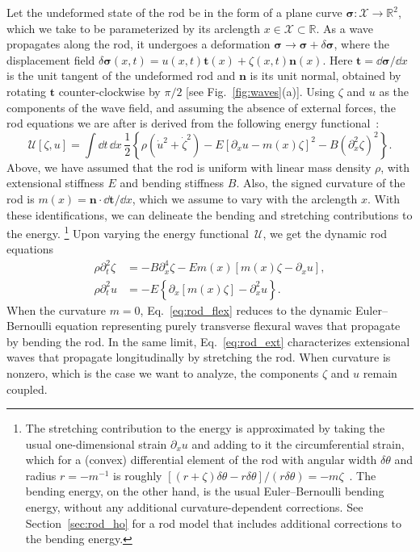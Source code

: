 Let the undeformed state of the rod be in the form of a plane curve $\bm{\sigma}: \mathcal{X} \to \mathbb{R}^{2}$, which we take to be parameterized by its arclength $x \in \mathcal{X} \subset \mathbb{R}$.
As a wave propagates along the rod, it undergoes a deformation $\bm{\sigma} \to \bm{\sigma} + \delta\bm{\sigma}$, where the displacement field $\delta\bm{\sigma}(x,t) = u(x,t)\bm{t}(x) + \zeta(x,t)\bm{n}(x)$.
Here $\bm{t} = \dd\bm{\sigma}/\dd{x}$ is the unit tangent of the undeformed rod and $\bm{n}$ is its unit normal, obtained by rotating $\bm{t}$ counter-clockwise by $\pi/2$ [see Fig.~\ref{fig:waves}(a)].
Using $\zeta$ and $u$ as the components of the wave field, and assuming the absence of external forces, the rod equations we are after is derived from the following energy functional~\cite{kernes2021}:
%
\begin{equation}
  \mathscr{U}[\zeta, u] = \int \dd{t}\,\dd{x}\,\frac{1}{2}\left\{\rho\left(\dot{u}^{2} + \dot{\zeta}^{2}\right) - E\left[\partial_{x}u - m(x)\zeta\right]^{2} - B\left(\partial_{x}^{2}\zeta\right)^{2}\right\}.
  \label{eq:rod_energy}
\end{equation}
%
Above, we have assumed that the rod is uniform with linear mass density $\rho$, with extensional stiffness $E$ and bending stiffness $B$.
Also, the signed curvature of the rod is $m(x) = \bm{n}\cdot\dd\bm{t}/\dd{x}$, which we assume to vary with the arclength $x$.
With these identifications, we can delineate the bending and stretching contributions to the energy.%
\footnote{%
  The stretching contribution to the energy is approximated by taking the usual one-dimensional strain $\partial_{x}u$ and adding to it the circumferential strain, which for a (convex) differential element of the rod with angular width $\delta\theta$ and radius $r = -m^{-1}$ is roughly $[(r + \zeta)\delta{\theta} - r\delta\theta]/(r\delta\theta) = -m\zeta$~\cite{donnell1933}.
The bending energy, on the other hand, is the usual Euler--Bernoulli bending energy, without any additional curvature-dependent corrections.
See Section~\ref{sec:rod_ho} for a rod model that includes additional corrections to the bending energy.}
Upon varying the energy functional~$\mathscr{U}$, we get the dynamic rod equations
%
\begin{subequations}
\begin{align}
  \label{eq:rod_flex}
  \rho\partial_{t}^{2}\zeta &= -B\partial_{x}^{4}\zeta - Em(x)\left[m(x)\zeta - \partial_{x}u\right],\\
  \rho\partial_{t}^{2}u &= -E\left\{\partial_{x}\left[m(x)\zeta\right] - \partial_{x}^{2}u\right\}.
  \label{eq:rod_ext}
\end{align}
\end{subequations}
%
When the curvature $m = 0$, Eq.~\eqref{eq:rod_flex} reduces to the dynamic Euler--Bernoulli equation representing purely transverse flexural waves that propagate by bending the rod.
In the same limit, Eq.~\eqref{eq:rod_ext} characterizes extensional waves that propagate longitudinally by stretching the rod.
When curvature is nonzero, which is the case we want to analyze, the components $\zeta$ and $u$ remain coupled.

